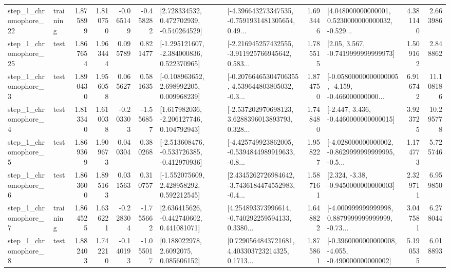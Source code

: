 \begin{tabular}{llrrrrllrlrr}
    step\_1\_chromophore\_22 &  training &      1.875899 &    1.810750 &     -0.065149 & -0.458282 &    [2.728334532, 0.472702939, -0.540264529] &  [-4.396643273347535, -0.7591931481305654, 0.49... &       1.693446 &  [4.048000000000001, 0.5230000000000032, -0.529... &            4.381140 &          2.663986 \\
    step\_1\_chromophore\_25 &      test &      1.867654 &    1.963444 &      0.095789 &  0.821477 &   [-1.295121607, -2.384000836, 0.522370965] &  [-2.216945257432555, -3.911925766945642, 0.583... &       1.785515 &                 [2.05, 3.567, -0.7419999999999973] &            1.509162 &          2.848862 \\
     step\_1\_chromophore\_3 &      test &      1.890430 &    1.956058 &      0.065627 &  0.581635 &    [-0.108963652, 2.698992205, 0.009968239] &  [-0.20766465304706355, 4.539644803805032, -0.3... &       1.874750 &  [-0.05800000000000005, -4.159, -0.466000000000... &            6.916742 &         11.108186 \\
     step\_1\_chromophore\_4 &      test &      1.813340 &    1.610038 &     -0.203303 & -1.556857 &    [1.617982036, -2.206127746, 0.104792943] &  [-2.537202970698123, 3.6288396013893793, 0.328... &       1.748480 &               [-2.447, 3.436, -0.4460000000000015] &            3.923725 &         10.295778 \\
     step\_1\_chromophore\_5 &      test &      1.869369 &    1.909673 &      0.040304 &  0.380268 &  [-2.513608476, -0.533726385, -0.412970936] &  [-4.425749923862005, -0.5394844989919633, -0.8... &       1.958227 &  [-4.028000000000002, -0.8629999999999995, -0.5... &            1.174773 &          5.725746 \\
     step\_1\_chromophore\_6 &      test &      1.863600 &    1.895163 &      0.031563 &  0.310757 &    [-1.552075609, 2.428958292, 0.592212545] &  [2.4345262726984642, -3.7436184474552983, -0.4... &       1.587161 &                [2.324, -3.38, -0.9450000000000003] &            2.329711 &          6.959850 \\
     step\_1\_chromophore\_7 &  training &      1.864525 &    1.636221 &     -0.228304 & -1.755662 &    [2.636415626, -0.442740602, 0.441081071] &  [4.254893373996614, -0.740292259594133, 0.3380... &       1.648822 &  [-4.000999999999998, 0.8879999999999999, -0.73... &            3.047581 &          6.278044 \\
     step\_1\_chromophore\_8 &      test &      1.882403 &    1.742210 &     -0.140193 & -1.055017 &       [0.188022978, 2.6092075, 0.085606152] &  [0.7290564843721681, 4.403303723214325, 0.1713... &       1.875861 &  [-0.3960000000000008, -4.055, -0.490000000000002] &            5.190535 &          6.018893 \\

\end{tabular}
